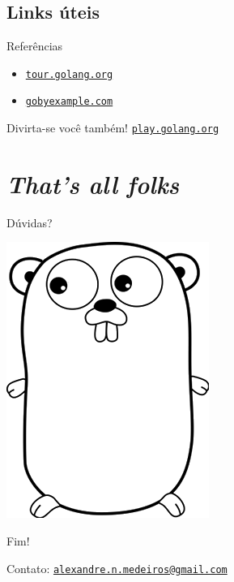 \documentclass{beamer}
\newcommand{\link}[1]{\href{http://#1}{\tt #1}}
\newcommand{\email}[1]{\href{mailto:#1}{\tt #1}}
\begin{document}
\subsection{Links úteis}
\begin{frame}
    {Referências}
    \begin{itemize}
        \item \link{tour.golang.org}
        \item \link{gobyexample.com}
    \end{itemize}
\end{frame}

\begin{frame}
    {Divirta-se você também!}
    \centering
    \link{play.golang.org}
\end{frame}

\section{\em That's all folks}
\begin{frame}
    \centering
    \Large
    Dúvidas?

    \vfill
    \includegraphics[width=.2\textwidth]{frontpage.png}
\end{frame}

\begin{frame}
    \centering
    \Large
    Fim!

    \vspace{20pt}
    \normalsize
    Contato: \email{alexandre.n.medeiros@gmail.com}
\end{frame}
\end{document}
